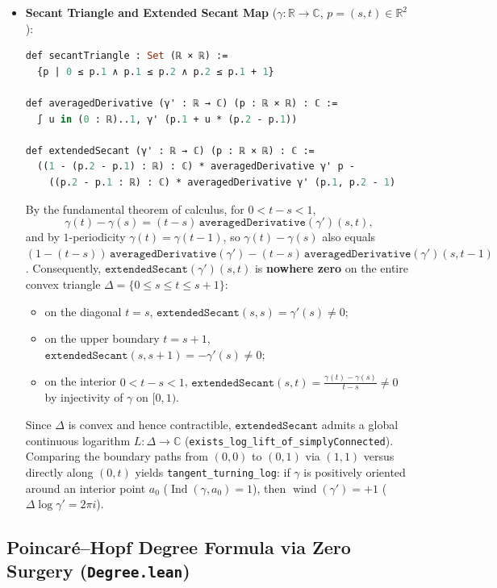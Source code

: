\documentclass[11pt,reqno]{amsart}
\theoremstyle{definition}
\newcommand{\C}{\mathbb{C}}
\newcommand{\R}{\mathbb{R}}
\newcommand{\wind}{\operatorname{wind}}
\newcommand{\ind}{\operatorname{Ind}}
\begin{document}
\begin{itemize}
\item \textbf{Secant Triangle and Extended Secant Map} ($\gamma : \R \to \C$, $p = (s,t) \in \R^2$):
\begin{lstlisting}[language=Caml]
def secantTriangle : Set (ℝ × ℝ) :=
  {p | 0 ≤ p.1 ∧ p.1 ≤ p.2 ∧ p.2 ≤ p.1 + 1}

def averagedDerivative (γ' : ℝ → ℂ) (p : ℝ × ℝ) : ℂ :=
  ∫ u in (0 : ℝ)..1, γ' (p.1 + u * (p.2 - p.1))

def extendedSecant (γ' : ℝ → ℂ) (p : ℝ × ℝ) : ℂ :=
  ((1 - (p.2 - p.1) : ℝ) : ℂ) * averagedDerivative γ' p -
    ((p.2 - p.1 : ℝ) : ℂ) * averagedDerivative γ' (p.1, p.2 - 1)
\end{lstlisting}
By the fundamental theorem of calculus, for $0 < t - s < 1$,
\[
\gamma(t) - \gamma(s) = (t-s)\,\texttt{averagedDerivative}(\gamma')(s,t),
\]
and by $1$-periodicity $\gamma(t) = \gamma(t-1)$, so $\gamma(t)-\gamma(s)$ also equals $(1-(t-s))\,\texttt{averagedDerivative}(\gamma') - (t-s)\,\texttt{averagedDerivative}(\gamma')(s,t-1)$. Consequently, $\texttt{extendedSecant}(\gamma')(s,t)$ is \textbf{nowhere zero} on the entire convex triangle $\Delta = \{0 \le s \le t \le s+1\}$:
\begin{itemize}
\item on the diagonal $t = s$, $\texttt{extendedSecant}(s,s) = \gamma'(s) \ne 0$;
\item on the upper boundary $t = s+1$, $\texttt{extendedSecant}(s,s+1) = -\gamma'(s) \ne 0$;
\item on the interior $0 < t-s < 1$, $\texttt{extendedSecant}(s,t) = \frac{\gamma(t)-\gamma(s)}{t-s} \ne 0$ by injectivity of $\gamma$ on $[0,1)$.
\end{itemize}
Since $\Delta$ is convex and hence contractible, $\texttt{extendedSecant}$ admits a global continuous logarithm $L : \Delta \to \C$ (\texttt{exists\_log\_lift\_of\_simplyConnected}). Comparing the boundary paths from $(0,0)$ to $(0,1)$ via $(1,1)$ versus directly along $(0,t)$ yields \texttt{tangent\_turning\_log}: if $\gamma$ is positively oriented around an interior point $a_0$ ($\ind(\gamma,a_0)=1$), then $\wind(\gamma') = +1$ ($\Delta\log\gamma' = 2\pi i$).
\end{itemize}

\subsection{Poincaré--Hopf Degree Formula via Zero Surgery (\texttt{Degree.lean})}
\end{document}
